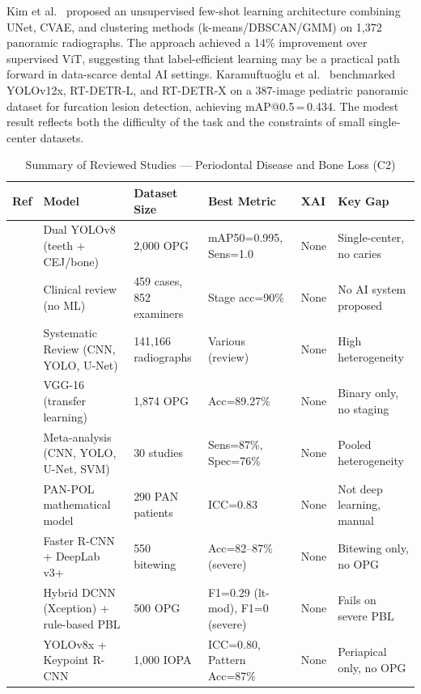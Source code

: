 \documentclass[conference]{IEEEtran}
\begin{document}
Kim et al.~\cite{kim2024unsupervised} proposed an unsupervised few-shot
learning architecture combining UNet, CVAE, and clustering methods
(k-means/DBSCAN/GMM) on 1,372 panoramic radiographs. The approach
achieved a 14\% improvement over supervised ViT, suggesting that
label-efficient learning may be a practical path forward in
data-scarce dental AI settings.
Karamuftuo\u{g}lu et al.~\cite{karamuftuo2025panoramic} benchmarked
YOLOv12x, RT-DETR-L, and RT-DETR-X on a 387-image pediatric panoramic
dataset for furcation lesion detection, achieving mAP@0.5\,=\,0.434.
The modest result reflects both the difficulty of the task and the
constraints of small single-center datasets.

\begin{table}[t]
\caption{Summary of Reviewed Studies --- Periodontal Disease and Bone Loss (C2)}
\label{tab:c2}
\centering
\small
\begin{tabular}{p{0.6cm} p{4.5cm} p{3.0cm} p{3.8cm} p{1.0cm} p{2.8cm}}
\toprule
\textbf{Ref} & \textbf{Model} & \textbf{Dataset Size} & \textbf{Best Metric} & \textbf{XAI} & \textbf{Key Gap} \\
\midrule
\cite{jundaeng2025advanced}  & Dual YOLOv8 (teeth + CEJ/bone) & 2,000 OPG & mAP50=0.995, Sens=1.0 & None & Single-center, no caries \\
\cite{chmielewski20252018}   & Clinical review (no ML) & 459 cases, 852 examiners & Stage acc=90\% & None & No AI system proposed \\
\cite{iacob2025automated}    & Systematic Review (CNN, YOLO, U-Net) & 141,166 radiographs & Various (review) & None & High heterogeneity \\
\cite{mathur2025comparative} & VGG-16 (transfer learning) & 1,874 OPG & Acc=89.27\% & None & Binary only, no staging \\
\cite{khubrani2025detection} & Meta-analysis (CNN, YOLO, U-Net, SVM) & 30 studies & Sens=87\%, Spec=76\% & None & Pooled heterogeneity \\
\cite{tian2025development}   & PAN-POL mathematical model & 290 PAN patients & ICC=0.83 & None & Not deep learning, manual \\
\cite{lee2025evaluation}     & Faster R-CNN + DeepLab v3+ & 550 bitewing & Acc=82--87\% (severe) & None & Bitewing only, no OPG \\
\cite{cerda2024determining}  & Hybrid DCNN (Xception) + rule-based PBL & 500 OPG & F1=0.29 (lt-mod), F1=0 (severe) & None & Fails on severe PBL \\
\cite{wimalasiri2025ai}      & YOLOv8x + Keypoint R-CNN & 1,000 IOPA & ICC=0.80, Pattern Acc=87\% & None & Periapical only, no OPG \\

\end{tabular}
\end{table}
\end{document}
